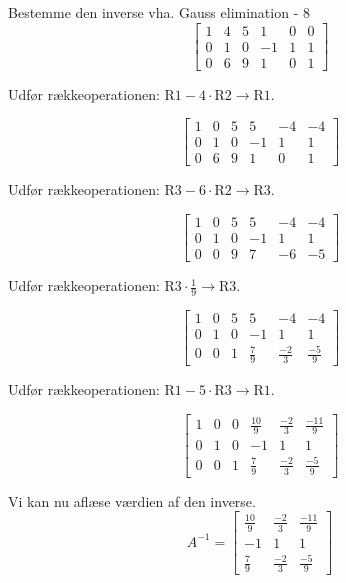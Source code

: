 \documentclass{article}
\begin{document}
\begin{exercise}{Bestemme den inverse vha. Gauss elimination - 8}
	\hint
	\[
	\left[\begin{array}{ccc|ccc}
	1 & 4 & 5 & 1 & 0 & 0 \\ 
	0 & 1 & 0 & -1 & 1 & 1 \\
	0 & 6 & 9 & 1 & 0 & 1 
	\end{array} \right]
	\]
	
	\hint
	Udfør rækkeoperationen: $\text{R1} - 4 \cdot \text{R2} \to \text{R1}$.
	
	\hint
	\[
	\left[\begin{array}{ccc|ccc}
	1 & 0 & 5 & 5 & -4 & -4 \\ 
	0 & 1 & 0 & -1 & 1 & 1 \\
	0 & 6 & 9 & 1 & 0 & 1 
	\end{array} \right]
	\]
	
	\hint
	Udfør rækkeoperationen: $\text{R3} - 6 \cdot \text{R2} \to \text{R3}$.
	
	\hint
	\[
	\left[\begin{array}{ccc|ccc}
	1 & 0 & 5 & 5 & -4 & -4 \\ 
	0 & 1 & 0 & -1 & 1 & 1 \\
	0 & 0 & 9 & 7 & -6 & -5 
	\end{array} \right]
	\]
	
	\hint
	Udfør rækkeoperationen: $\text{R3} \cdot \frac{1}{9}  \to \text{R3}$.
	
	\hint
	\[
	\left[\begin{array}{ccc|ccc}
	1 & 0 & 5 & 5 & -4 & -4 \\ 
	0 & 1 & 0 & -1 & 1 & 1 \\
	0 & 0 & 1 & \frac{7}{9} & \frac{-2}{3} & \frac{-5}{9} 
	\end{array} \right]
	\]
	
	\hint
	Udfør rækkeoperationen: $\text{R1} - 5 \cdot \text{R3} \to \text{R1}$.
	
	\hint
	\[
	\left[\begin{array}{ccc|ccc}
	1 & 0 & 0 & \frac{10}{9} & \frac{-2}{3} & \frac{-11}{9} \\ 
	0 & 1 & 0 & -1 & 1 & 1 \\
	0 & 0 & 1 & \frac{7}{9} & \frac{-2}{3} & \frac{-5}{9} 
	\end{array} \right]
	\]
	
	\hint
	Vi kan nu aflæse værdien af den inverse.
	\[
	A^{-1} = \left[\begin{array}{ccc}
	\frac{10}{9} & \frac{-2}{3} & \frac{-11}{9} \\ 
	-1 & 1 & 1 \\
	\frac{7}{9} & \frac{-2}{3} & \frac{-5}{9} 
	\end{array} \right]
	\]
	
	
\end{exercise}
\end{document}
